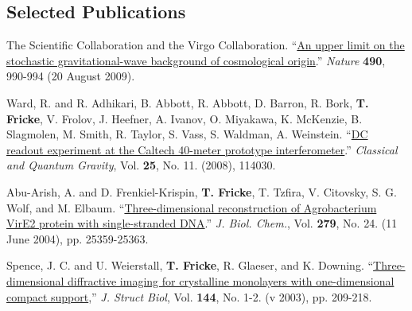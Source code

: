 \documentclass[margin,line]{res}
\begin{document}
\begin{resume}


\section{\sc Selected Publications}

The {} Scientific Collaboration and the Virgo Collaboration. ``\href{http://arxiv.org/abs/0910.5772}{An upper limit on the stochastic gravitational-wave background of cosmological origin}.''  \emph{Nature} \textbf{490}, 990-994 (20 August 2009). 

Ward, R. and R. Adhikari, B. Abbott, R. Abbott, D. Barron, R. Bork, \textbf{T. Fricke}, V. Frolov, J. Heefner, A. Ivanov, O. Miyakawa, K. McKenzie, B. Slagmolen, M. Smith, R. Taylor, S. Vass, S. Waldman, A. Weinstein. ``\href{http://iopscience.iop.org/0264-9381/25/11/114030/}{DC readout experiment at the Caltech 40-meter prototype interferometer}.'' \emph{Classical and Quantum Gravity}, Vol. \textbf{25}, No. 11. (2008), 114030. 

Abu-Arish, A. and D. Frenkiel-Krispin, \textbf{T. Fricke}, T. Tzfira, V. Citovsky, S. G. Wolf, and M. Elbaum. ``\href{http://www.jbc.org/content/279/24/25359.abstract}{Three-dimensional reconstruction of Agrobacterium VirE2 protein with single-stranded DNA}.'' \emph{J. Biol. Chem.}, Vol. \textbf{279}, No. 24. (11 June 2004), pp. 25359-25363.

Spence, J. C. and U. Weierstall, \textbf{T. Fricke}, R. Glaeser, and K. Downing. ``\href{http://www.ncbi.nlm.nih.gov/sites/entrez?Db=pubmed&Cmd=ShowDetailView&TermToSearch=14643223}{Three-dimensional diffractive imaging for crystalline monolayers with one-dimensional compact support},'' \emph{J. Struct Biol}, Vol. \textbf{144}, No. 1-2. (v 2003), pp. 209-218.


\end{resume}
\end{document}
